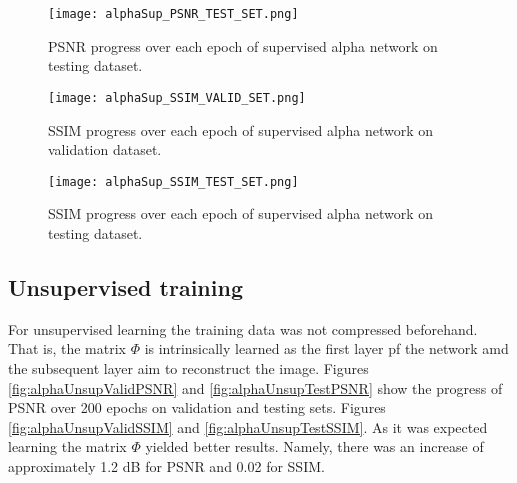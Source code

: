 \begin{figure}[!htb] 
\centering 
\texttt{[image: alphaSup\_PSNR\_TEST\_SET.png]} 
\caption[PSNR testing progress during training of supervised alpha network]{PSNR progress over each epoch of supervised alpha network on testing dataset.}
\label{fig:alphaSupTestPSNR} 
\end{figure}  

\begin{figure}[!htb] 
\centering 
\texttt{[image: alphaSup\_SSIM\_VALID\_SET.png]} 
\caption[SSIM validation progress during training of supervised alpha network]{SSIM progress over each epoch of supervised alpha network on validation dataset.}
\label{fig:alphaSupValidSSIM} 
\end{figure}  

\begin{figure}[!htb]
\centering 
\texttt{[image: alphaSup\_SSIM\_TEST\_SET.png]} 
\caption[SSIM testing progress during training of supervised alpha network]{SSIM progress over each epoch of supervised alpha network on testing dataset.}
\label{fig:alphaSupTestSSIM} 
\end{figure}  



\FloatBarrier

\subsection{Unsupervised training}
For unsupervised learning the training data was not compressed beforehand. That is, the matrix $\Phi$ is intrinsically learned as the first layer pf the network amd the subsequent layer aim to reconstruct the image. Figures \ref{fig:alphaUnsupValidPSNR} and \ref{fig:alphaUnsupTestPSNR} show the progress of PSNR over 200 epochs on validation and testing sets. Figures \ref{fig:alphaUnsupValidSSIM} and \ref{fig:alphaUnsupTestSSIM}. As it was expected learning the matrix $\Phi$ yielded better results. Namely, there was an increase of approximately 1.2 dB for PSNR and 0.02 for SSIM.    

